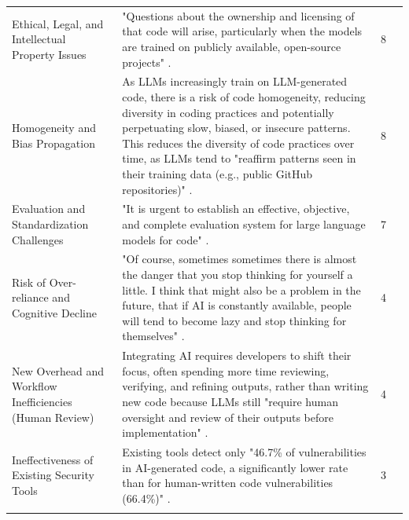 {\begin{longtable}{>{\raggedright\arraybackslash} p{3cm} p{9.3cm} p{0.2cm} p{1.8cm}}
Ethical, Legal, and Intellectual Property Issues & "Questions about the ownership and licensing of that code will arise, particularly when the models are trained on publicly available, open-source projects" \cite{Haque:2025la}. & 8 & \cite{Terragni:2025fa, AlHashimi:2025er, Zamfiroiu:2025ec, Ahmed:2025ai, Durrani:2024ad, Banh:2025cf, Basha:2025tt, Haque:2025la} \\ \addlinespace

Homogeneity and Bias Propagation & As LLMs increasingly train on LLM-generated code, there is a risk of code homogeneity, reducing diversity in coding practices and potentially perpetuating slow, biased, or insecure patterns. This reduces the diversity of code practices over time, as LLMs tend to "reaffirm patterns seen in their training data (e.g., public GitHub repositories)" \cite{Terragni:2025fa}. & 8 & \cite{Terragni:2025fa, Basha:2025tt, Haque:2025la, AlHashimi:2025er, Farhanna:2025eu, Banh:2025cf, Ahmed:2025ai, Ramos:2025aa } \\ \addlinespace

Evaluation and Standardization Challenges & "It is urgent to establish an effective, objective, and complete evaluation system for large language models for code" \cite{Ahmed:2025ai}. & 7 & \cite{Ahmed:2025ai, Yoo:2025sa, Hemmat:2025rd, Pendyala:2025pi, Farhanna:2025eu, Jabrw:2025ss, Han:2025mg} \\ \addlinespace

Risk of Over-reliance and Cognitive Decline & "Of course, sometimes sometimes there is almost the danger that you stop thinking for yourself a little. I think that might also be a problem in the future, that if AI is constantly available, people will tend to become lazy and stop thinking for themselves" \cite{Banh:2025cf}. & 4 & \cite{Banh:2025cf, Basha:2025tt, Jensen:2025me, Zamfiroiu:2025ec} \\ \addlinespace

New Overhead and Workflow Inefficiencies (Human Review) & Integrating AI requires developers to shift their focus, often spending more time reviewing, verifying, and refining outputs, rather than writing new code because LLMs still "require human oversight and review of their outputs before implementation" \cite{Kim:2025ao}. & 4 & \cite{Kim:2025ao, Durrani:2024ad, Banh:2025cf, Zamfiroiu:2025ec} \\ \addlinespace

Ineffectiveness of Existing Security Tools & Existing tools detect only "46.7\% of vulnerabilities in AI-generated code, a significantly lower rate than for human-written code vulnerabilities (66.4\%)" \cite{Yoo:2025sa}. & 3 & \cite{Yoo:2025sa, AlHashimi:2025er, Jabrw:2025ss} \\ \addlinespace

\end{longtable}
}


